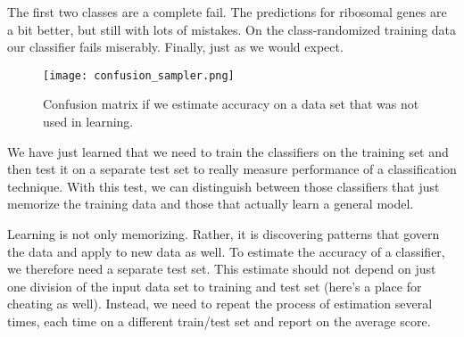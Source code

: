 The first two classes are a complete fail. The predictions for ribosomal genes are a bit better, but still with lots of mistakes. On the class-randomized training data our classifier fails miserably. Finally, just as we would expect.

\begin{figure}[h]
    \texttt{[image: confusion\_sampler.png]}
    \caption{Confusion matrix if we estimate accuracy on a data set that was not used in learning.}
\end{figure}

We have just learned that we need to train the classifiers on the training set and then test it on a separate test set to really measure performance of a classification technique. With this test, we can distinguish between those classifiers that just memorize the training data and those that actually learn a general model.

Learning is not only memorizing. Rather, it is discovering patterns that govern the data and apply to new data as well. To estimate the accuracy of a classifier, we therefore need a separate test set. This estimate should not depend on just one division of the input data set to training and test set (here’s a place for cheating as well). Instead, we need to repeat the process of estimation several times, each time on a different train/test set and report on the average score.